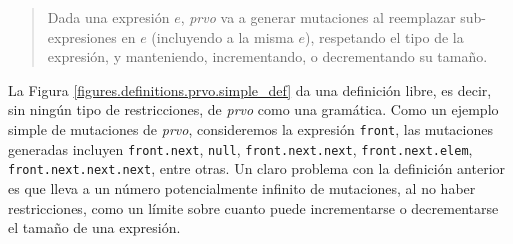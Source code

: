 \begin{quote}
	Dada una expresi\'on $e$, \emph{prvo} va a generar mutaciones al reemplazar sub-expresiones en $e$ (incluyendo a la misma $e$), respetando el tipo de la expresi\'on, y manteniendo, incrementando, o decrementando su tama\~no.
\end{quote}
La Figura \ref{figures.definitions.prvo.simple_def} da una definici\'on libre, es decir, sin ning\'un tipo de restricciones, de \emph{prvo} como una gram\'atica. Como un ejemplo simple de mutaciones de \emph{prvo}, consideremos la expresi\'on \texttt{front}, las mutaciones generadas incluyen \texttt{front.next}, \texttt{null}, \texttt{front.next.next}, \texttt{front.next.elem}, \texttt{front.next.next.next}, entre otras. Un claro problema con la definici\'on anterior es que lleva a un n\'umero potencialmente infinito de mutaciones, al no haber restricciones, como un l\'imite sobre cuanto puede incrementarse o decrementarse el tama\~no de una expresi\'on.

